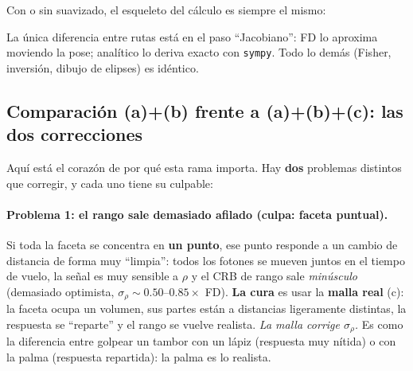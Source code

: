 \documentclass[11pt,a4paper]{article}
\begin{document}
Con o sin suavizado, el esqueleto del c\'alculo es siempre el mismo:
\begin{center}
\end{center}

La \'unica diferencia entre rutas est\'a en el paso ``Jacobiano'': FD lo aproxima
moviendo la pose; anal\'itico lo deriva exacto con \texttt{sympy}. Todo lo dem\'as
(Fisher, inversi\'on, dibujo de elipses) es id\'entico.

\subsection{Comparaci\'on (a)+(b) frente a (a)+(b)+(c): las dos correcciones}

Aqu\'i est\'a el coraz\'on de por qu\'e esta rama importa. Hay \textbf{dos}
problemas distintos que corregir, y cada uno tiene su culpable:

\paragraph{Problema 1: el rango sale demasiado afilado (culpa: faceta puntual).}
Si toda la faceta se concentra en \textbf{un punto}, ese punto responde a un
cambio de distancia de forma muy ``limpia'': todos los fotones se mueven juntos en
el tiempo de vuelo, la se\~nal es muy sensible a $\rho$ y el CRB de rango sale
\emph{minúsculo} (demasiado optimista, $\sigma_\rho\sim0.50$--$0.85\times$ FD).
\textbf{La cura} es usar la \textbf{malla real} (c): la faceta ocupa un volumen,
sus partes est\'an a distancias ligeramente distintas, la respuesta se ``reparte''
y el rango se vuelve realista. \emph{La malla corrige $\sigma_\rho$.} Es como la
diferencia entre golpear un tambor con un l\'apiz (respuesta muy n\'itida) o con la
palma (respuesta repartida): la palma es lo realista.
\end{document}
